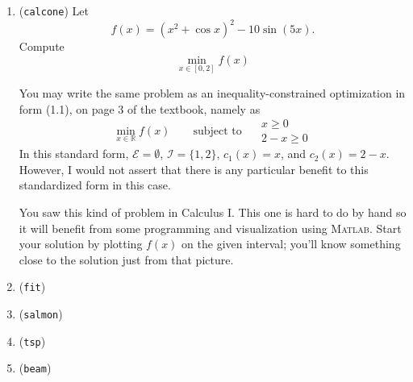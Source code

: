 \documentclass[12pt]{amsart}
\newcommand{\RR}{\mathbb{R}}
\newcommand{\Matlab}{\textsc{Matlab}\xspace}
\begin{document}
\bigskip
\renewcommand{\labelenumi}{\Roman{enumi}. \quad}
\begin{enumerate}
\item (\texttt{calcone})  \quad Let
    $$f(x) = \left(x^2 + \cos x\right)^2 - 10 \sin(5 x).$$
Compute
    $$\min_{x\in [0,2]} f(x)$$

You may write the same problem as an inequality-constrained optimization in form (1.1), on page 3 of the textbook, namely as
	$$\min_{x\in\RR} f(x) \qquad \text{subject to }\quad \begin{matrix} x \ge 0 \\ 2 - x \ge 0\end{matrix}$$
In this standard form, $\mathcal{E}=\emptyset$, $\mathcal{I}=\{1,2\}$, $c_1(x)=x$, and $c_2(x)=2-x$.  However, I would not assert that there is any particular benefit to this standardized form in this case.

You saw this kind of problem in Calculus I.  This one is hard to do by hand so it will benefit from some programming and visualization using \Matlab.  Start your solution by plotting $f(x)$ on the given interval; you'll know something close to the solution just from that picture.


\medskip
\item (\texttt{fit})  \quad 

\medskip
\item (\texttt{salmon})  \quad 

\medskip
\item (\texttt{tsp})  \quad 

\medskip
\item (\texttt{beam})  \quad 
\end{enumerate}
\end{document}
